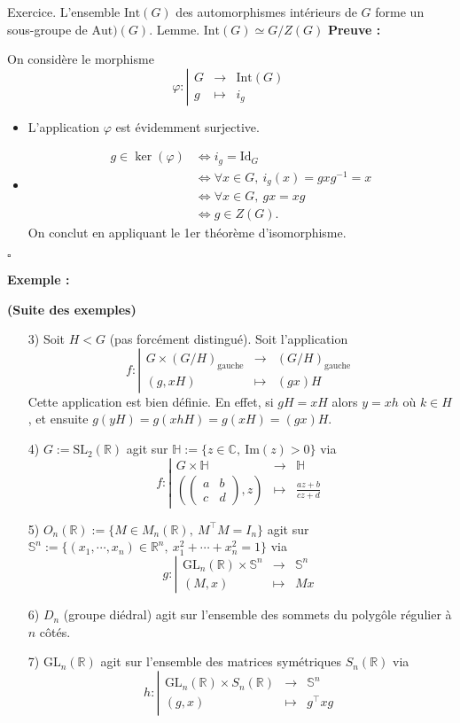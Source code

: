 \documentclass{report}
\renewenvironment{leftbar}{%
  \def\FrameCommand{\vrule width 0.4pt \hspace{10pt}}%
  \MakeFramed {\advance\hsize-\width \FrameRestore}}%
 {\endMakeFramed}%
\newenvironment{preuve}{\vspace*{0.5cm}
    \begin{leftbar}
    \noindent\textbf{Preuve :}\par}{
    \begin{flushright}
    $\square$
    \end{flushright}
    \end{leftbar}
}
\newenvironment{exemple}{\begin{tcolorbox}[colback=gray!10,colframe= white]
    \textbf{Exemple :}
     \par}
    {\end{tcolorbox}}
\newcommand{\ssi}{\Longleftrightarrow}
\newcommand{\R}{\mathbb{R}}
\newcommand{\C}{\mathbb{C}}
\newcommand{\D}{\right}
\newcommand{\G}{\left}
\newcommand{\jus}{\ju\vspace{0.5cm}}
\newcommand{\ju}{\justify}
\newcommand{\fonctions}[5]{\begin{displaymath}#1:\left| \begin{array}{ccc}
 #2 & \longrightarrow & #3 \\
    #4 & \longmapsto & #5 \end{array}\right.\end{displaymath}}
\begin{document}
\jus 
Exercice. L'ensemble $\text{Int}(G)$ des automorphismes intérieurs de $G$ forme un sous-groupe de $\text{Aut})(G)$. 
\jus 
Lemme. $\text{Int}(G)\simeq G/Z(G)$
\ju 
\begin{preuve}
On considère le morphisme 
\fonctions{\varphi}{G}{\text{Int}(G)}{g}{i_g}
\begin{itemize}
\item L'application $\varphi$ est évidemment surjective. 
\item 
\begin{align*}
g\in\ker(\varphi) &\ssi i_g=\text{Id}_G
\\ &\ssi \forall x\in G,\ i_g(x)=gxg^{-1}=x
\\ &\ssi \forall x\in G,\ gx=xg
\\ &\ssi g\in Z(G).
\end{align*}
On conclut en appliquant le 1er théorème d'isomorphisme.
\end{itemize}
\end{preuve}
\begin{exemple} \textbf{(Suite des exemples)}
\begin{itemize}
\item[3)] Soit $H<G$ (pas forcément distingué). Soit l'application 
\fonctions{f}{G\times (G/H)_{\text{gauche}}}{(G/H)_{\text{gauche}}}{(g,xH)}{(gx)H}
Cette application est bien définie. En effet, si $gH=xH$ alors $y=xh$ où $k\in H$, et ensuite $g(yH)=g(xhH)=g(xH)=(gx)H$. 
\item[4)] $G:=\text{SL}_2(\R)$ agit sur $\mathbb{H}:=\{z\in\C,\ \text{Im}(z)>0\}$ via 
\fonctions{f}{G\times \mathbb{H}}{\mathbb{H}}{\G(\begin{pmatrix}a&b\\ c&d\end{pmatrix} ,z\D)}{\frac{az+b}{cz+d}}
\item[5)] $O_n(\R):=\{M\in M_n(\R),\ M^\top M=I_n\}$ agit sur $\mathbb{S}^n:=\{(x_1,\cdots,x_n)\in\R^n,\ x_1^2+\cdots+x_n^2=1\}$ via 
\fonctions{g}{\text{GL}_n(\R)\times\mathbb{S}^n}{\mathbb{S}^n}{(M,x)}{Mx}
\item[6)] $D_n$ (groupe diédral) agit sur l'ensemble des sommets du polygôle régulier à $n$ côtés. 
\item[7)] $\text{GL}_n(\R)$ agit sur l'ensemble des matrices symétriques $S_n(\R)$ via 
\fonctions{h}{\text{GL}_n(\R)\times S_n(\R)}{\mathbb{S}^n}{(g,x)}{g^{\top}xg}
\end{itemize} 
\end{exemple}
\jus 
\end{document}
